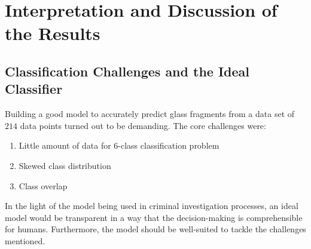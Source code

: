 \section{Interpretation and Discussion of the Results}

\subsection{Classification Challenges and the Ideal Classifier}
Building a good model to accurately predict glass fragments from a data set of $214$ data points turned out to be demanding. The core challenges were:

\begin{enumerate}
    \item Little amount of data for 6-class classification problem
    \item Skewed class distribution 
    \item Class overlap
\end{enumerate}

In the light of the model being used in criminal investigation processes, an ideal model would be transparent in a way that the decision-making is comprehensible for humans. Furthermore, the model should be well-suited to tackle the challenges mentioned.



